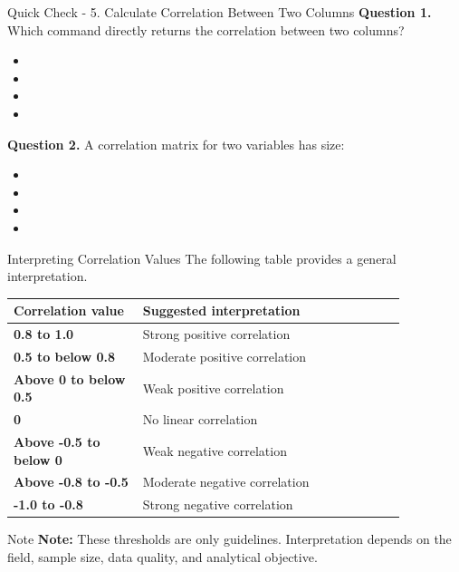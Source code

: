 \documentclass[aspectratio=169,11pt]{beamer}
\begin{document}
\begin{frame}[allowframebreaks]{Quick Check - 5. Calculate Correlation Between Two Columns}
\footnotesize
\textbf{Question 1.} Which command directly returns the correlation between two columns?\par\medskip
\begin{itemize}
\item[\textbf{A.}] \texttt{}
\item[\textbf{B.}] \texttt{}
\item[\textbf{C.}] \texttt{}
\item[\textbf{D.}] \texttt{}
\end{itemize}
\textbf{Question 2.} A correlation matrix for two variables has size:\par\medskip
\begin{itemize}
\item[\textbf{A.}] \texttt{}
\item[\textbf{B.}] \texttt{}
\item[\textbf{C.}] \texttt{}
\item[\textbf{D.}] \texttt{}
\end{itemize}
\end{frame}
\begin{frame}[allowframebreaks]{Interpreting Correlation Values}
\small
The following table provides a general interpretation.\par\medskip
\begin{center}\scriptsize
\begin{tabular}{@{}p{0.28\linewidth}p{0.58\linewidth}@{}}
\toprule
\textbf{Correlation value} & \textbf{Suggested interpretation}\\
\midrule
\textbf{0.8 to 1.0} & Strong positive correlation\\
\textbf{0.5 to below 0.8} & Moderate positive correlation\\
\textbf{Above 0 to below 0.5} & Weak positive correlation\\
\textbf{0} & No linear correlation\\
\textbf{Above -0.5 to below 0} & Weak negative correlation\\
\textbf{Above -0.8 to -0.5} & Moderate negative correlation\\
\textbf{-1.0 to -0.8} & Strong negative correlation\\
\bottomrule
\end{tabular}
\end{center}
\begin{block}{Note}
\textbf{Note:} These thresholds are only guidelines. Interpretation depends on the field, sample size, data quality, and analytical objective.
\end{block}
\end{frame}
\end{document}
